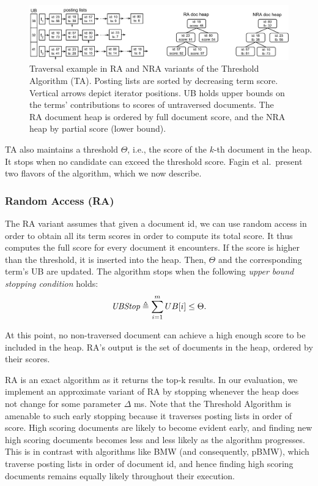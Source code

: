 \begin{figure}[tbh]
\centering
\includegraphics[width=\linewidth]{figures/postingsLists}
\caption{Traversal example in  RA and NRA variants of the Threshold Algorithm (TA). Posting lists are sorted by decreasing term score. Vertical arrows depict  iterator positions.  UB  holds upper bounds on the terms' contributions to scores of untraversed documents. The RA document heap is ordered by full document score, and the NRA heap  by partial score (lower bound).}
\label{fig:lists}
\end{figure}

TA also maintains a threshold $\Theta$, i.e., the score of the $k$-th document in the heap.
It stops when no candidate can exceed the threshold score. 
Fagin et al.\ present two flavors of the algorithm, which we now describe.

\subsubsection{Random Access (RA)} 
The RA variant assumes that given a document id, we can use random access in order to obtain all its term scores in order to compute its total score. It thus computes the full score for every document it encounters. If the score is higher than the threshold, it is inserted into the heap. Then, $\Theta$ and the corresponding term's UB are updated. The algorithm stops when 
the following \emph{upper bound stopping condition} holds:
\begin{equation} \label{eq:stop}
\textit{UBStop} \triangleq \sum_{i=1}^m UB[i] \le \Theta.
\end{equation}

At this point, no non-traversed document can achieve a high enough score to be included in the heap. RA's output is the set of documents in the heap, ordered by their scores.

RA is an exact  algorithm as it returns the top-k results. In our evaluation, we implement an approximate variant of RA by stopping whenever the heap does not change for some parameter $\Delta$ ms. 
Note that the Threshold Algorithm is amenable to such early stopping because it traverses posting lists in order of score. High scoring documents are likely to become evident early, and finding new high scoring documents becomes less and less likely as the algorithm progresses. This is in contrast with algorithms like BMW (and consequently, pBMW), which traverse posting lists in order of document id, and hence finding high scoring documents remains equally likely throughout their execution.

